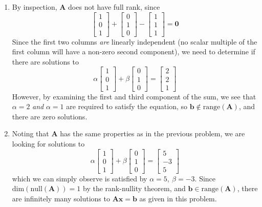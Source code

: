 \documentclass[]{article}
\newcommand{\bbm}{\begin{bmatrix}}		%
\newcommand{\ebm}{\end{bmatrix}}		%
\newcommand{\x}{\bm{x}}					%
\newcommand{\A}{\bm{A}}					%
\newcommand{\vrange}{\mathrm{range}}		%
\newcommand{\vdim}{\mathrm{dim}}		%
\newcommand{\vnull}{\mathrm{null}}		%
\begin{document}
\begin{enumerate}[resume]
\begin{enumerate}
	  \item By inspection, $\A$ does not have full rank, since
        $$ \bbm 1\\0\\1 \ebm + \bbm 0\\1\\0 \ebm - \bbm 1\\1\\1 \ebm =
        \bm{0} $$ Since the first two columns {\em are} linearly
        independent (no scalar multiple of the first column will have
        a non-zero second component), we need to determine if there
        are solutions to
        $$ \alpha \bbm 1\\0\\1 \ebm + \beta \bbm 0\\1\\0 \ebm = \bbm
        2\\2\\1 \ebm $$ However, by examining the first and third
        component of the sum, we see that $\alpha = 2$ {\em and}
        $\alpha = 1$ are required to satisfy the equation, so $\bm{b}
        \not\in \vrange(\A)$, and there are zero solutions.
        
	  \item Noting that $\A$ has the same properties as in the
        previous problem, we are looking for solutions to
        $$ \alpha \bbm 1\\0\\1 \ebm + \beta \bbm 0\\1\\0 \ebm = \bbm
        5\\-3\\5 \ebm $$ which we can simply observe is satisfied by
        $\alpha = 5,~\beta = -3$. Since $\vdim(\vnull(\A)) = 1$ by the
        rank-nullity theorem, and $\bm{b} \in \vrange(\A)$, there are
        infinitely many solutions to $\A\x = \bm{b}$ as given in
        this problem.
	  \end{enumerate}
    \end{enumerate}
\end{document}

